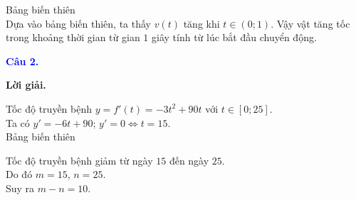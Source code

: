 \documentclass[12pt,a4paper]{article}
\begin{document}
		Bảng biến thiên\\


		Dựa vào bảng biến thiên, ta thấy $v(t)$ tăng khi $t\in (0;1)$. Vậy vật tăng tốc trong khoảng thời gian từ gian $1$ giây tính từ lúc bắt đầu chuyển động.

\medskip
\noindent\textcolor{blue}{\textbf{Câu 2.}}

\noindent\textbf{Lời giải.}

Tốc độ truyền bệnh $y=f'(t)=-3t^2+90t$ với $t\in [0; 25]$.\\

		Ta có $y'=-6t+90$; $y'=0\Leftrightarrow t=15$.\\

		Bảng biến thiên
		

		Tốc độ truyền bệnh giảm từ ngày $15$ đến ngày $25$.\\

		Do đó $m=15$, $n=25$.\\
Suy ra $m-n=10$.

\medskip
\end{document}

